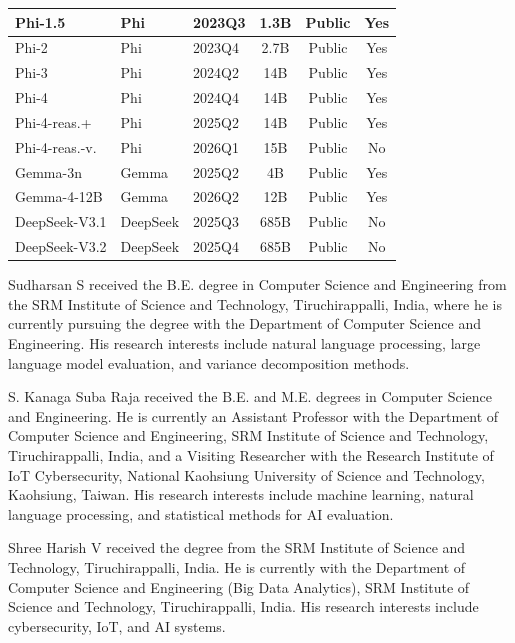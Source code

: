 \documentclass{ieeeaccess}
\theoremstyle{definition}
\theoremstyle{plain}
\begin{document}
\begin{table}[!t]
\begin{tabular}{l l l c c c}
\hline
Phi-1.5 & Phi & 2023Q3 & 1.3B & Public & Yes \\
\hline
Phi-2 & Phi & 2023Q4 & 2.7B & Public & Yes \\
\hline
Phi-3 & Phi & 2024Q2 & 14B & Public & Yes \\
\hline
Phi-4 & Phi & 2024Q4 & 14B & Public & Yes \\
\hline
Phi-4-reas.+ & Phi & 2025Q2 & 14B & Public & Yes \\
\hline
Phi-4-reas.-v. & Phi & 2026Q1 & 15B & Public & No \\
\hline
Gemma-3n & Gemma & 2025Q2 & 4B & Public & Yes \\
\hline
Gemma-4-12B & Gemma & 2026Q2 & 12B & Public & Yes \\
\hline
DeepSeek-V3.1 & DeepSeek & 2025Q3 & 685B & Public & No \\
\hline
DeepSeek-V3.2 & DeepSeek & 2025Q4 & 685B & Public & No \\
\hline
\end{tabular}
\end{table}

\begin{IEEEbiographynophoto}{Sudharsan S}
received the B.E. degree in Computer Science and Engineering from the SRM Institute of Science and Technology, Tiruchirappalli, India, where he is currently pursuing the degree with the Department of Computer Science and Engineering. His research interests include natural language processing, large language model evaluation, and variance decomposition methods.
\end{IEEEbiographynophoto}

\begin{IEEEbiographynophoto}{S. Kanaga Suba Raja}
received the B.E. and M.E. degrees in Computer Science and Engineering. He is currently an Assistant Professor with the Department of Computer Science and Engineering, SRM Institute of Science and Technology, Tiruchirappalli, India, and a Visiting Researcher with the Research Institute of IoT Cybersecurity, National Kaohsiung University of Science and Technology, Kaohsiung, Taiwan. His research interests include machine learning, natural language processing, and statistical methods for AI evaluation.
\end{IEEEbiographynophoto}

\begin{IEEEbiographynophoto}{Shree Harish V}
received the degree from the SRM Institute of Science and Technology, Tiruchirappalli, India. He is currently with the Department of Computer Science and Engineering (Big Data Analytics), SRM Institute of Science and Technology, Tiruchirappalli, India. His research interests include cybersecurity, IoT, and AI systems.
\end{IEEEbiographynophoto}
\end{document}
